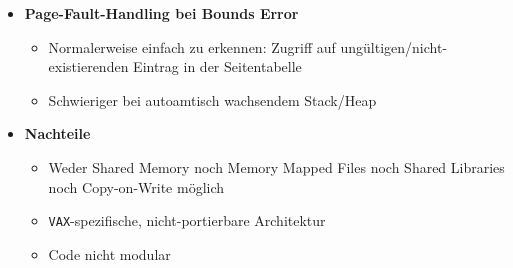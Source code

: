 \begin{itemize}
\begin{itemize}
		\item Laden des Programms mittels \textit{Demand Paging Policy}\footnote{Es werden immer nur die Programmteile geladen, die gerade gebraucht werden.}
		\item Verschiedene Strategien zum Initialisieren der Seitentabelleneinträge: Fill-from-Text, Zero-Fill, Invalid, etc.
	\end{itemize}
	\item \textbf{Page-Fault-Handling bei Bounds Error}
	\begin{itemize}
		\item Normalerweise einfach zu erkennen: Zugriff auf ungültigen/nicht-existierenden Eintrag in der Seitentabelle
		\item Schwieriger bei autoamtisch wachsendem Stack/Heap
	\end{itemize}
	\item \textbf{Nachteile}
	\begin{itemize}
		\item Weder Shared Memory noch Memory Mapped Files noch Shared Libraries noch Copy-on-Write möglich
		\item \texttt{VAX}-spezifische, nicht-portierbare Architektur
		\item Code nicht modular
	\end{itemize}
\end{itemize}

